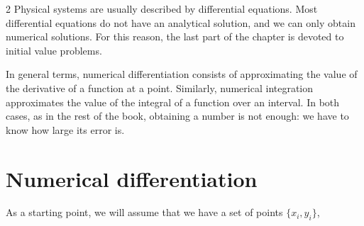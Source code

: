 \begin{paracol}{2}
Physical systems are usually described by differential equations. Most differential equations do not have an analytical solution, and we can only obtain numerical solutions. For this reason, the last part of the chapter is devoted to initial value problems.

In general terms, numerical differentiation consists of approximating the value of the derivative of a function at a point. Similarly, numerical integration approximates the value of the integral of a function over an interval. In both cases, as in the rest of the book, obtaining a number is not enough: we have to know how large its error is.

\section{Numerical differentiation}
As a starting point, we will assume that we have a set of points $\{x_i,y_i\}$,
\end{paracol}

